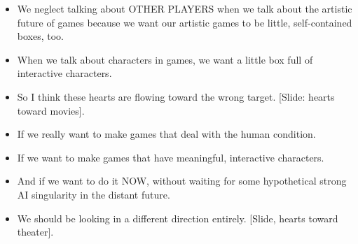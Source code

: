 \documentclass[12pt]{article}
\begin{document}
{\begin{itemize}
\item We neglect talking about OTHER PLAYERS when we talk about the artistic future of games because we want our artistic games to be little, self-contained boxes, too.  

\item When we talk about characters in games, we want a little box full of interactive characters.


\item So I think these hearts are flowing toward the wrong target. [Slide:  hearts toward movies].  

\item If we really want to make games that deal with the human condition.  

\item If we want to make games that have meaningful, interactive characters.  

\item And if we want to do it NOW, without waiting for some hypothetical strong AI singularity in the distant future. 

\item We should be looking in a different direction entirely.  [Slide, hearts toward theater].



\end{itemize}
}
\end{document}

